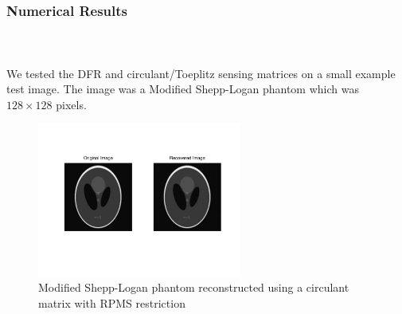 
\begin{frame}[t]
\frametitle{Numerical Results}
\framesubtitle{~~}  %

We tested the DFR and circulant/Toeplitz sensing matrices on a small example
test image. The image was a Modified Shepp-Logan phantom which was $128\times 128$
pixels.

\begin{figure}[h!]
  \centering
	\caption{Modified Shepp-Logan phantom reconstructed using a circulant matrix with RPMS restriction}
    \includegraphics[width=0.6\textwidth]{figs/rpms.pdf}
\end{figure}

\end{frame}




